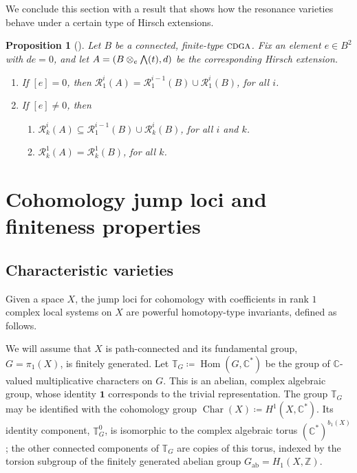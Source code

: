 \documentclass{article}
\numberwithin{equation}{section}
\newtheorem{proposition}[theorem]{Proposition}
\theoremstyle{definition}
\newcommand{\Z}{\mathbb{Z}}
\renewcommand{\C}{\mathbb{C}}
\newcommand{\T}{\mathbb{T}}
\newcommand{\RR}{\mathcal{R}}
\newcommand{\cdga}{\ensuremath{\textsc{cdga}}}
\DeclareMathOperator{\ab}{{ab}}
\DeclareMathOperator{\Hom}{{Hom}}
\DeclareMathOperator{\Char}{Char}
\newcommand{\one}{\mathbf{1}}
\newcommand{\bwedge}{\mbox{\normalsize $\bigwedge$}}
\begin{document}
We conclude this section with a result that shows how the 
resonance varieties behave under a certain type 
of Hirsch extensions.

\begin{proposition}[\cite{PS-imrn19}]
\label{prop:hirsch-res}
Let $B$ be a connected, finite-type $\cdga$. Fix an element $e\in B^2$ with $de=0$, and 
let $A=(B\otimes_{e} \bwedge (t), d)$ be the corresponding Hirsch extension. 
\begin{enumerate}
\item  \label{e0}
If $[e]=0$, then $\RR^i_1(A) =  \RR^{i-1}_1(B) \cup \RR^i_1(B)$, for all $i$. 
\item   \label{e1}
If $[e]\ne 0$, then
\begin{enumerate}
\item[(a)] \label{r1}
$\RR^i_k (A)\subseteq \RR^{i-1}_1 (B) \cup \RR^i_k (B)$, for all $i$ and $k$.
\item[(b)] \label{r2}
$\RR^1_k (A)=\RR^1_k (B)$, for all $k$.
\end{enumerate}
\end{enumerate}
\end{proposition}

\section{Cohomology jump loci and finiteness properties}
\label{sect:cjl}

\subsection{Characteristic varieties}
\label{subsec:charvar}

Given a space $X$, the jump loci for cohomology with coefficients in rank $1$ 
complex local systems on $X$ are powerful homotopy-type invariants, 
defined as follows.   

We will assume that $X$ is path-connected and its fundamental 
group, $G=\pi_1(X)$, is finitely generated. Let 
$\T_G\coloneqq \Hom(G, \C^{*})$ be the  group of $\C$-valued 
multiplicative characters on $G$. This is an abelian, complex 
algebraic group, whose identity $\one$ corresponds to the 
trivial representation.  The group $\T_G$ may be identified with 
the cohomology group $\Char(X)\coloneqq  H^1(X,\C^*)$. 
Its identity component, $\T^0_G$, is isomorphic to the complex 
algebraic torus $(\C^*)^{b_1(X)}$; the other connected components 
of $\T_G$ are copies of this torus, indexed by the torsion subgroup 
of the finitely generated abelian group $G_{\ab}=H_1(X,\Z)$.  
\end{document}
